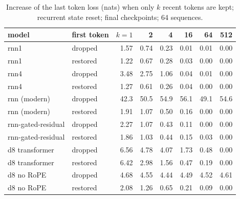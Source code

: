 \begin{table}[h]\centering\small
\caption{Increase of the last token loss (nats) when only $k$ recent tokens are kept; recurrent state reset; final checkpoints; 64 sequences.}
\label{tab:p2ctx}
\begin{tabular}{llrrrrrr}\toprule
model & first token & $k=1$ & 2 & 4 & 16 & 64 & 512\\\midrule
rnn1 & dropped & 1.57 & 0.74 & 0.23 & 0.01 & 0.01 & 0.00\\
rnn1 & restored & 1.22 & 0.67 & 0.28 & 0.03 & 0.00 & 0.00\\
rnn4 & dropped & 3.48 & 2.75 & 1.06 & 0.04 & 0.01 & 0.00\\
rnn4 & restored & 1.27 & 0.61 & 0.26 & 0.04 & 0.00 & 0.00\\
rnn (modern) & dropped & 42.3 & 50.5 & 54.9 & 56.1 & 49.1 & 54.6\\
rnn (modern) & restored & 1.91 & 1.07 & 0.50 & 0.16 & 0.00 & 0.00\\
rnn-gated-residual & dropped & 2.27 & 1.07 & 0.43 & 0.11 & 0.00 & 0.00\\
rnn-gated-residual & restored & 1.86 & 1.03 & 0.44 & 0.15 & 0.03 & 0.00\\
d8 transformer & dropped & 6.56 & 4.78 & 4.07 & 1.73 & 0.48 & 0.00\\
d8 transformer & restored & 6.42 & 2.98 & 1.56 & 0.47 & 0.19 & 0.00\\
d8 no RoPE & dropped & 4.68 & 4.55 & 4.44 & 4.49 & 4.52 & 4.61\\
d8 no RoPE & restored & 2.08 & 1.26 & 0.65 & 0.21 & 0.09 & 0.00\\
\bottomrule\end{tabular}
\end{table}
